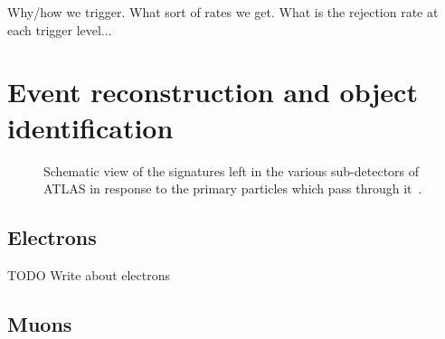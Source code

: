 {\color{red} Why/how we trigger. What sort of rates we get. What is the
rejection rate at each trigger level...}

\FloatBarrier
\section{Event reconstruction and object identification}

\begin{figure}[ht]
  \caption{
    Schematic view of the signatures left in the various sub-detectors of ATLAS
    in response to the primary particles which pass through
    it~\cite{Pequenao:1505342}.
  }
  \label{fig:particle_signatures}
\end{figure}

\FloatBarrier
\subsection{Electrons} 
\label{sec:elctrons}

{\color{red} TODO Write about electrons}

\FloatBarrier
\subsection{Muons} 
\label{sec:muons}

